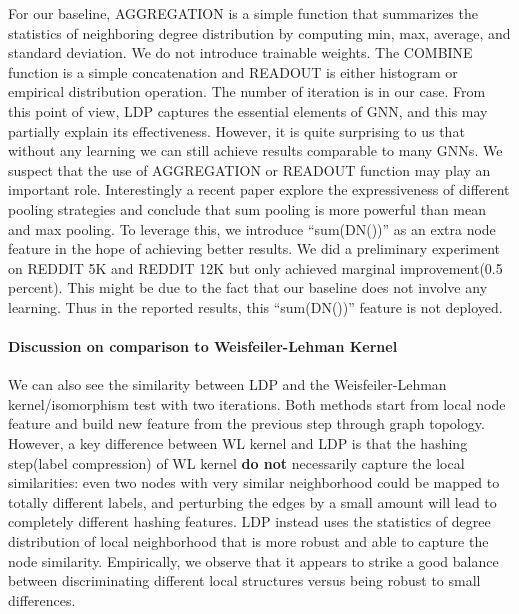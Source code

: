 \documentclass[11pt,onecolumn]{article}
\newcommand{\DOM}       {{LDP}\xspace}
\begin{document}
For our baseline, AGGREGATION is a simple function that summarizes the statistics of neighboring degree distribution by computing min, max, average, and standard deviation. We do not introduce trainable weights. The COMBINE function is a simple concatenation and READOUT is either histogram or empirical distribution operation. The number of iteration is  in our case. From this point of view, \DOM{} captures the essential elements of GNN, and this may partially explain its effectiveness. However, it is quite surprising to us that without any learning we can still achieve results comparable to many GNNs. We suspect that the use of AGGREGATION or READOUT function may play an important role. Interestingly a recent paper\cite{xu2018powerful} explore the expressiveness of different pooling strategies and conclude that sum pooling is more powerful than mean and max pooling. 
To leverage this, we introduce  ``sum(DN())'' as an extra node feature in the hope of achieving better results. We did a preliminary experiment on REDDIT 5K and REDDIT 12K but only achieved marginal improvement(0.5 percent). This might be due to the fact that our baseline does not involve any learning. Thus in the reported results, this ``sum(DN())'' feature is not deployed. 
 
\paragraph{Discussion on  comparison to Weisfeiler-Lehman Kernel}
We can also see the similarity between \DOM{} and the Weisfeiler-Lehman kernel/isomorphism test with two iterations.  Both methods start from local node feature and build new feature from the previous step through graph topology. However, a key difference between WL kernel and \DOM{} is that the hashing step(label compression) of WL kernel {\bf do not} necessarily capture the local similarities: even two nodes with very similar neighborhood could be mapped to totally different labels, and perturbing the edges by a small amount will lead to completely different hashing features. \DOM{} instead uses the statistics of degree distribution of local neighborhood that is more robust and able to capture the node similarity. Empirically, we observe that it appears to strike a good balance between discriminating different local structures versus being robust to small differences.
\end{document}
